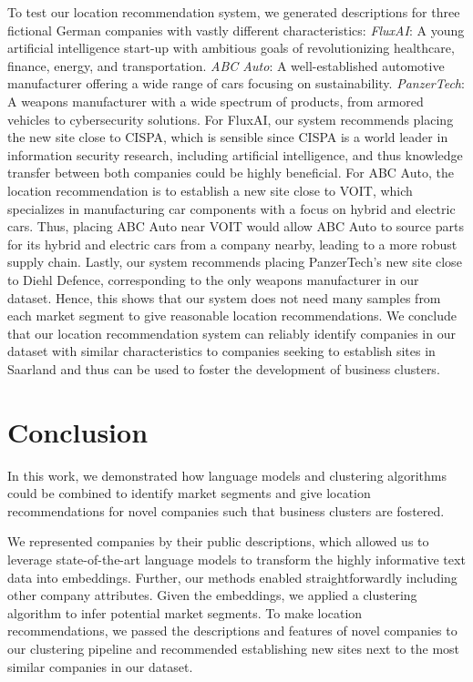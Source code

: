 \documentclass[12pt]{article}
\begin{document}
   To test our location recommendation system, we generated descriptions for three fictional German companies with vastly different characteristics:
   \textit{FluxAI}: A young artificial intelligence start-up with ambitious goals of revolutionizing healthcare, finance, energy, and transportation.    
   \textit{ABC Auto}: A well-established automotive manufacturer offering a wide range of cars focusing on sustainability.    
   \textit{PanzerTech}: A weapons manufacturer with a wide spectrum of products, from armored vehicles to cybersecurity solutions.       
   For FluxAI, our system recommends placing the new site close to CISPA, which is sensible since CISPA is a world leader in information security research, including artificial intelligence, and thus knowledge transfer between both companies could be highly beneficial. 
   For ABC Auto, the location recommendation is to establish a new site close to VOIT, which specializes in manufacturing car components with a focus on hybrid and electric cars. Thus, placing ABC Auto near VOIT would allow ABC Auto to source parts for its hybrid and electric cars from a company nearby, leading to a more robust supply chain.
   Lastly, our system recommends placing PanzerTech's new site close to Diehl Defence, corresponding to the only weapons manufacturer in our dataset. Hence, this shows that our system does not need many samples from each market segment to give reasonable location recommendations.   
   We conclude that our location recommendation system can reliably identify companies in our dataset with similar characteristics to companies seeking to establish sites in Saarland and thus can be used to foster the development of business clusters.
   
   \section{Conclusion}
   In this work, we demonstrated how language models and clustering algorithms could be combined to identify market segments and give location recommendations for novel companies such that business clusters are fostered.
   
   We represented companies by their public descriptions, which allowed us to leverage state-of-the-art language models to transform the highly informative text data into embeddings. Further, our methods enabled straightforwardly including other company attributes. Given the embeddings, we applied a clustering algorithm to infer potential market segments.
   To make location recommendations, we passed the descriptions and features of novel companies to our clustering pipeline and recommended establishing new sites next to the most similar companies in our dataset.
   
\end{document}
